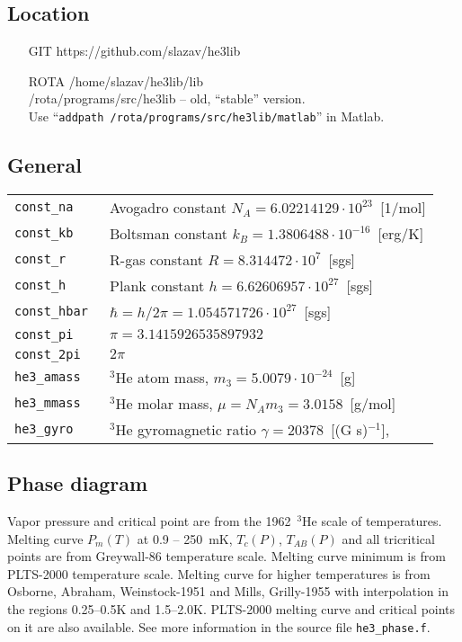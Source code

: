 \documentclass[a4paper]{article}
\begin{document}
\subsection*{Location}
\begin{itemize}
\item[GIT]  https://github.com/slazav/he3lib
\item[ROTA]
/home/slazav/he3lib/lib\\
/rota/programs/src/he3lib -- old, ``stable'' version.\\
Use ``{\tt addpath /rota/programs/src/he3lib/matlab}'' in Matlab.
\end{itemize}


\subsection*{General}

\medskip
\noindent\begin{tabular}{lp{11cm}}
\tt const\_na      & Avogadro constant $N_A = 6.02214129 \cdot 10^{23}$~[1/mol]\\
\tt const\_kb      & Boltsman constant $k_B = 1.3806488 \cdot 10^{-16}$~[erg/K]\\
\tt const\_r       & R-gas constant $R = 8.314472 \cdot 10^{7}$~[sgs]\\
\tt const\_h       & Plank constant $h = 6.62606957 \cdot 10^{27}$~[sgs]\\
\tt const\_hbar    & $\hbar = h/2\pi = 1.054571726 \cdot 10^{27}$~[sgs]\\
\tt const\_pi      & $\pi = 3.1415926535897932$\\
\tt const\_2pi     & $2\pi$\\
\tt he3\_amass     & $^3$He atom mass, $m_3 = 5.0079 \cdot 10^{-24}$~[g]\\
\tt he3\_mmass     & $^3$He molar mass, $\mu = N_A m_3 = 3.0158$~[g/mol]\\
\tt he3\_gyro      & $^3$He gyromagnetic ratio $\gamma = 20378$~[(G s)$^{-1}$],\\
\end{tabular}
\medskip

\eject
\subsection*{Phase diagram}

Vapor pressure and critical point are from the {1962~$^3$He scale of
temperatures}. Melting curve $P_m(T)$ at 0.9 -- 250~mK, $T_c(P)$,
$T_{AB}(P)$ and all tricritical points are from {Greywall-86 temperature
scale}. Melting curve minimum is from PLTS-2000 temperature scale.
Melting curve for higher temperatures is from {Osborne, Abraham, Weinstock-1951} and {Mills, Grilly-1955} with
interpolation in the regions 0.25--0.5K and 1.5--2.0K. PLTS-2000 melting
curve and critical points on it are also available. See more information
in the source file {\tt he3\_phase.f}.
\end{document}
